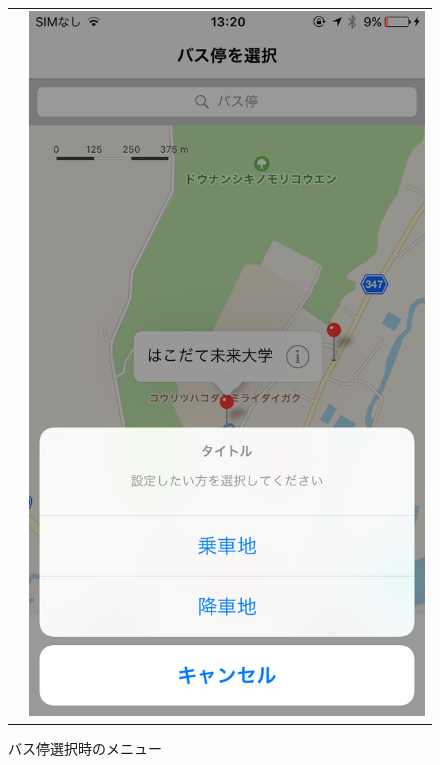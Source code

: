 \documentclass[openany,11pt,papersize]{jsbook}
\begin{document}
\begin{figure}[H]
\begin{tabular}{cc}
\begin{minipage}[t]{0.45\hsize}
        \caption{バス停の選択}
        \label{fig:select}
      \end{minipage} &
      \begin{minipage}[t]{0.45\hsize}
        \centering
        \includegraphics[keepaspectratio, scale=0.2]{img/select_bus.png}
        \caption{バス停選択時のメニュー}
        \label{fig:select_bus}
      \end{minipage}\\

\end{tabular}
\end{figure}
\end{document}

